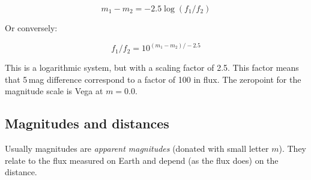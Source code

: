 \begin{equation}
m_1 - m_2 = -2.5 \log{(f_1 / f_2)}
\end{equation}

Or conversely:

\begin{equation}
f_1 / f_2 = 10^{(m_1 - m_2) / -2.5}
\end{equation}

This is a logarithmic system, but with a scaling factor of 2.5. This factor means that 5\,mag difference correspond to a factor of 100 in flux. The zeropoint for the magnitude scale is Vega at $m = 0.0$.

\subsection{Magnitudes and distances}

Usually magnitudes are \textit{apparent magnitudes} (donated with small letter $m$). They relate to the flux measured on Earth and depend (as the flux does) on the distance. 








